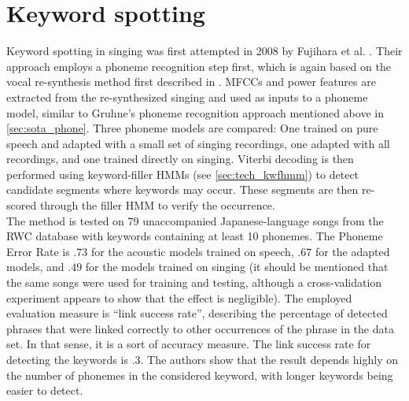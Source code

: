 \section{Keyword spotting}
Keyword spotting in singing was first attempted in 2008 by Fujihara et al. \cite{hyperlinking_lyrics}. Their approach employs a phoneme recognition step first, which is again based on the vocal re-synthesis method first described in \cite{fujihara_identification}. MFCCs and power features are extracted from the re-synthesized singing and used as inputs to a phoneme model, similar to Gruhne's phoneme recognition approach mentioned above in \ref{sec:sota_phone}.  Three phoneme models are compared: One trained on pure speech and adapted with a small set of singing recordings, one adapted with all recordings, and one trained directly on singing. Viterbi decoding is then performed using keyword-filler HMMs (see \ref{sec:tech_kwfhmm}) to detect candidate segments where keywords may occur. These segments are then re-scored through the filler HMM to verify the occurrence.\\
The method is tested on 79 unaccompanied Japanese-language songs from the RWC database \cite{rwc} with keywords containing at least 10 phonemes. The Phoneme Error Rate is $.73$ for the acoustic models trained on speech, $.67$ for the adapted models, and $.49$ for the models trained on singing (it should be mentioned that the same songs were used for training and testing, although a cross-validation experiment appears to show that the effect is negligible). The employed evaluation measure is ``link success rate'', describing the percentage of detected phrases that were linked correctly to other occurrences of the phrase in the data set. In that sense, it is a sort of accuracy measure. The link success rate for detecting the keywords is $.3$. The authors show that the result depends highly on the number of phonemes in the considered keyword, with longer keywords being easier to detect.\\

